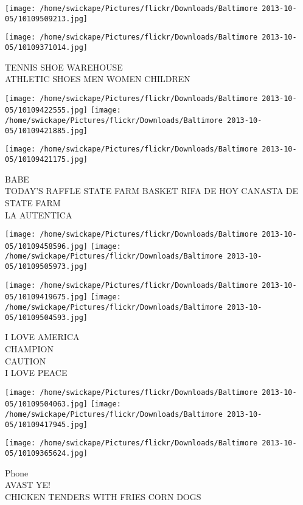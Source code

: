 \documentclass[10pt,letterpaper]{article}
\begin{document}
\texttt{[image: /home/swickape/Pictures/flickr/Downloads/Baltimore 2013-10-05/10109509213.jpg]}

\vspace{0.25in}
\texttt{[image: /home/swickape/Pictures/flickr/Downloads/Baltimore 2013-10-05/10109371014.jpg]}

TENNIS SHOE WAREHOUSE\\
ATHLETIC SHOES MEN WOMEN CHILDREN
\pagebreak

\texttt{[image: /home/swickape/Pictures/flickr/Downloads/Baltimore 2013-10-05/10109422555.jpg]}
\texttt{[image: /home/swickape/Pictures/flickr/Downloads/Baltimore 2013-10-05/10109421885.jpg]}

\vspace{0.25in}
\texttt{[image: /home/swickape/Pictures/flickr/Downloads/Baltimore 2013-10-05/10109421175.jpg]}

BABE\\
TODAY'S RAFFLE STATE FARM BASKET RIFA DE HOY CANASTA DE STATE FARM\\
LA AUTENTICA
\pagebreak

\texttt{[image: /home/swickape/Pictures/flickr/Downloads/Baltimore 2013-10-05/10109458596.jpg]}
\texttt{[image: /home/swickape/Pictures/flickr/Downloads/Baltimore 2013-10-05/10109505973.jpg]}

\texttt{[image: /home/swickape/Pictures/flickr/Downloads/Baltimore 2013-10-05/10109419675.jpg]}
\texttt{[image: /home/swickape/Pictures/flickr/Downloads/Baltimore 2013-10-05/10109504593.jpg]}

I LOVE AMERICA\\
CHAMPION\\
CAUTION\\
I LOVE PEACE
\pagebreak

\texttt{[image: /home/swickape/Pictures/flickr/Downloads/Baltimore 2013-10-05/10109504063.jpg]}
\texttt{[image: /home/swickape/Pictures/flickr/Downloads/Baltimore 2013-10-05/10109417945.jpg]}

\vspace{0.25in}
\texttt{[image: /home/swickape/Pictures/flickr/Downloads/Baltimore 2013-10-05/10109365624.jpg]}

Phone\\
AVAST YE!\\
CHICKEN TENDERS WITH FRIES CORN DOGS
\pagebreak
\end{document}
